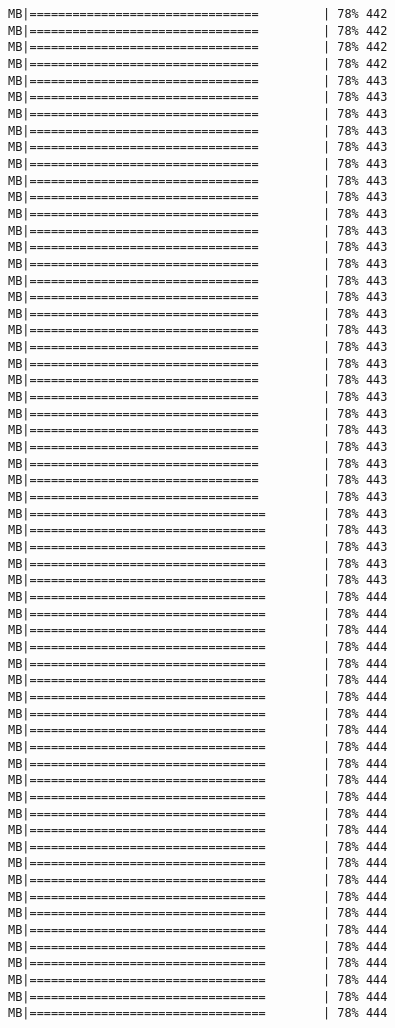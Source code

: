 \documentclass[
]{article}
\begin{document}
\begin{verbatim}
MB|================================         | 78% 442 MB|================================         | 78% 442 MB|================================         | 78% 442 MB|================================         | 78% 442 MB|================================         | 78% 443 MB|================================         | 78% 443 MB|================================         | 78% 443 MB|================================         | 78% 443 MB|================================         | 78% 443 MB|================================         | 78% 443 MB|================================         | 78% 443 MB|================================         | 78% 443 MB|================================         | 78% 443 MB|================================         | 78% 443 MB|================================         | 78% 443 MB|================================         | 78% 443 MB|================================         | 78% 443 MB|================================         | 78% 443 MB|================================         | 78% 443 MB|================================         | 78% 443 MB|================================         | 78% 443 MB|================================         | 78% 443 MB|================================         | 78% 443 MB|================================         | 78% 443 MB|================================         | 78% 443 MB|================================         | 78% 443 MB|================================         | 78% 443 MB|================================         | 78% 443 MB|================================         | 78% 443 MB|================================         | 78% 443 MB|=================================        | 78% 443 MB|=================================        | 78% 443 MB|=================================        | 78% 443 MB|=================================        | 78% 443 MB|=================================        | 78% 443 MB|=================================        | 78% 444 MB|=================================        | 78% 444 MB|=================================        | 78% 444 MB|=================================        | 78% 444 MB|=================================        | 78% 444 MB|=================================        | 78% 444 MB|=================================        | 78% 444 MB|=================================        | 78% 444 MB|=================================        | 78% 444 MB|=================================        | 78% 444 MB|=================================        | 78% 444 MB|=================================        | 78% 444 MB|=================================        | 78% 444 MB|=================================        | 78% 444 MB|=================================        | 78% 444 MB|=================================        | 78% 444 MB|=================================        | 78% 444 MB|=================================        | 78% 444 MB|=================================        | 78% 444 MB|=================================        | 78% 444 MB|=================================        | 78% 444 MB|=================================        | 78% 444 MB|=================================        | 78% 444 MB|=================================        | 78% 444 MB|=================================        | 78% 444 MB|=================================        | 78% 444 
\end{verbatim}
\end{document}
